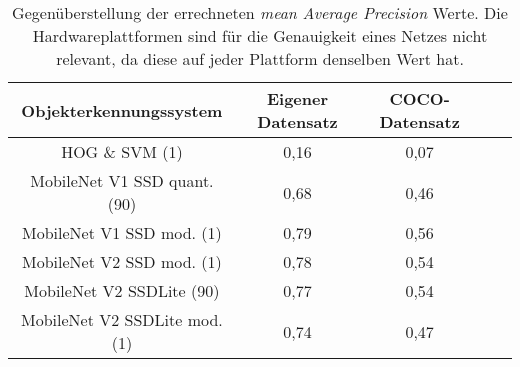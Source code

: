 \begin{table}[H]
	\caption{Gegenüberstellung der errechneten \textit{mean Average Precision} Werte. Die Hardwareplattformen sind für die Genauigkeit eines Netzes nicht relevant, da diese auf jeder Plattform denselben Wert hat.  }
	\begin{center}
		
		\begin{tabular}{|c|c|c|c|c|}
			\hline
			\multicolumn{1}{|c|}{Objekterkennungssystem} & \multicolumn{1}{c|}{Eigener Datensatz} & \multicolumn{1}{c|}{COCO-Datensatz} \\ \hline
			HOG \& SVM (1)	& 0,16	& 0,07		 \\
			MobileNet V1 SSD quant. (90)			&0,68	&0,46	 	 \\
			MobileNet V1 SSD mod. (1)		&0,79	&0,56	 \\
			MobileNet V2 SSD mod. (1)	&0,78 &0,54  \\
			MobileNet V2 SSDLite (90)			&0,77	& 0,54	 \\
			MobileNet V2 SSDLite mod. (1)			&0,74	&0,47	 \\
			
			\hline
		\end{tabular}
	\end{center}

	\label{fig: genauigkeiten}
\end{table}